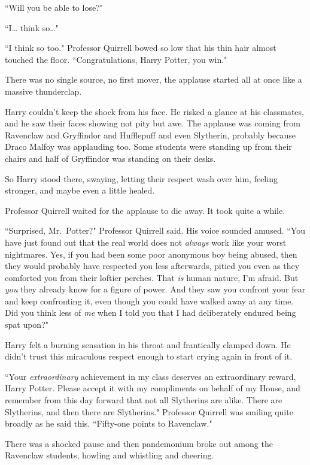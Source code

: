 ``Will you be able to lose?"

``I{\ldots} think so{\ldots}"

``I think so too." Professor Quirrell bowed so low that his thin hair almost touched the floor. ``Congratulations, Harry Potter, you win."

There was no single source, no first mover, the applause started all at once like a massive thunderclap.

Harry couldn't keep the shock from his face. He risked a glance at his classmates, and he saw their faces showing not pity but awe. The applause was coming from Ravenclaw and Gryffindor and Hufflepuff and even Slytherin, probably because Draco Malfoy was applauding too. Some students were standing up from their chairs and half of Gryffindor was standing on their desks.

So Harry stood there, swaying, letting their respect wash over him, feeling stronger, and maybe even a little healed.

Professor Quirrell waited for the applause to die away. It took quite a while.

``Surprised, Mr.~Potter?" Professor Quirrell said. His voice sounded amused. ``You have just found out that the real world does not \emph{always} work like your worst nightmares. Yes, if you had been some poor anonymous boy being abused, then they would probably have respected you less afterwards, pitied you even as they comforted you from their loftier perches. That \emph{is} human nature, I'm afraid. But \emph{you} they already know for a figure of power. And they saw you confront your fear and keep confronting it, even though you could have walked away at any time. Did you think less of \emph{me} when I told you that I had deliberately endured being spat upon?"

Harry felt a burning sensation in his throat and frantically clamped down. He didn't trust this miraculous respect enough to start crying again in front of it.

``Your \emph{extraordinary} achievement in my class deserves an extraordinary reward, Harry Potter. Please accept it with my compliments on behalf of my House, and remember from this day forward that not all Slytherins are alike. There are Slytherins, and then there are Slytherins." Professor Quirrell was smiling quite broadly as he said this. ``Fifty-one points to Ravenclaw."

There was a shocked pause and then pandemonium broke out among the Ravenclaw students, howling and whistling and cheering.

